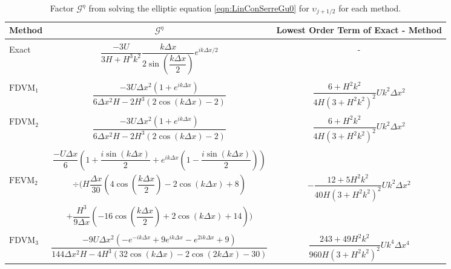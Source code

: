 \begin{landscape}
	\begin{table}
		\centering   
		\begin{tabular}{l  c  c}
			Method& $\mathcal{G}^\eta$ & Lowest Order Term of Exact - Method \T \\
			\hline \\ 
			Exact &  $\dfrac{-3U }{3H + H^3k^2} \dfrac{k\Delta x}{2 \sin\left(\dfrac{k \Delta x}{2}\right)}e^{ik\Delta x/2}$ & - \\ \\
			$\text{FDVM}_1$& $\dfrac{-3 U\Delta x^2 \left(1 + e^{ik\Delta x}\right)}{6\Delta x^2 H - 2H^3 \left(2\cos\left(k\Delta x\right) - 2\right)}$ & $\dfrac{6 +H^2k^2}{4H \left(3 + H^2k^2\right)^2}Uk^2 \Delta x^2$  \\ \\
			$\text{FDVM}_2$& $\dfrac{-3U \Delta x^2 \left({1 + e^{ik\Delta x}}\right)}{6 \Delta x^2 H - 2H^3 \left(2\cos\left(k\Delta x\right) - 2\right)}$ & $\dfrac{6 +H^2k^2}{4H \left(3 + H^2k^2\right)^2}Uk^2 \Delta x^2$  \\ \\
			& $\dfrac{-U\Delta x}{6} \left(1 + \dfrac{i \sin\left(k \Delta x\right)}{2} + e^{ik\Delta x}\left(1 - \dfrac{i \sin\left(k \Delta x\right)}{2}\right) \right)$ & \\  $\text{FEVM}_2$ & $\div  \Bigg( H\dfrac{\Delta x}{30} \left(4\cos\left(\dfrac{k \Delta x}{2}\right) - 2\cos\left({k \Delta x}\right) + 8\right) $  & $-\dfrac{12 + 5H^2k^2}{40H \left(3 + H^2k^2\right)^2}Uk^2 \Delta x^2$ \\ &$+ \dfrac{H^3 }{9\Delta x}\left(-16\cos\left(\dfrac{k\Delta x}{2}\right) + 2 \cos\left(k \Delta x\right) + 14\right)    \Bigg)$ & \\ \\
			$\text{FDVM}_3$&  $\dfrac{-9U \Delta x^2 \left({-e^{-ik\Delta x} + 9e^{ik\Delta x} - e^{2ik\Delta x} + 9}\right)}{144 \Delta x^2H - 4H^3\left(32\cos\left(k \Delta x\right) -2\cos\left(2k \Delta x\right) - 30\right)}$ & $\dfrac{243 + 49H^2k^2}{960H\left(3 + H^2k^2\right)^2}Uk^4 \Delta x^4$ \T \B \\
			\hline
		\end{tabular}
		\caption{Factor $\mathcal{G}^\eta$ from solving the elliptic equation \eqref{eqn:LinConSerreGu0} for $\upsilon_{j+1/2}$ for each method.}
		\label{tab:Gnfactor} 
	\end{table}
\end{landscape}


